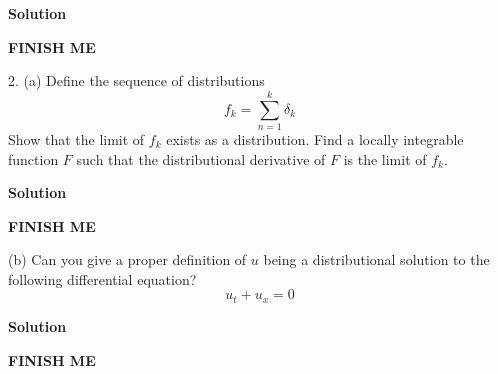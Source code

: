 \documentclass{article}
\begin{document}
\textbf{Solution}

\textbf{FINISH ME}

\newpage

2. (a) Define the sequence of distributions
%
\begin{equation*}
    f_k = \sum_{n = 1}^k \delta_k
\end{equation*}
%
Show that the limit of $f_k$ exists as a distribution. Find a locally
integrable function $F$ such that the distributional derivative of $F$
is the limit of $f_k$.

\textbf{Solution}

\textbf{FINISH ME}

\vspace{5mm}

(b) Can you give a proper definition of $u$ being a distributional
solution to the following differential equation?
%
\begin{equation*}
    u_t + u_x = 0
\end{equation*}

\textbf{Solution}

\textbf{FINISH ME}
\end{document}
